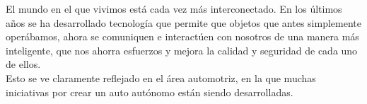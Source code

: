 \begin{introduction}
El mundo en el que vivimos está cada vez más interconectado. En los últimos años se ha desarrollado tecnología que permite que objetos que antes simplemente operábamos, ahora se comuniquen e interactúen con nosotros de una manera más inteligente, que nos ahorra esfuerzos y mejora la calidad y seguridad de cada uno de ellos. \\
Esto se ve claramente reflejado en el área automotriz, en la que muchas iniciativas por crear un auto autónomo están siendo desarrolladas.
\end{introduction}
